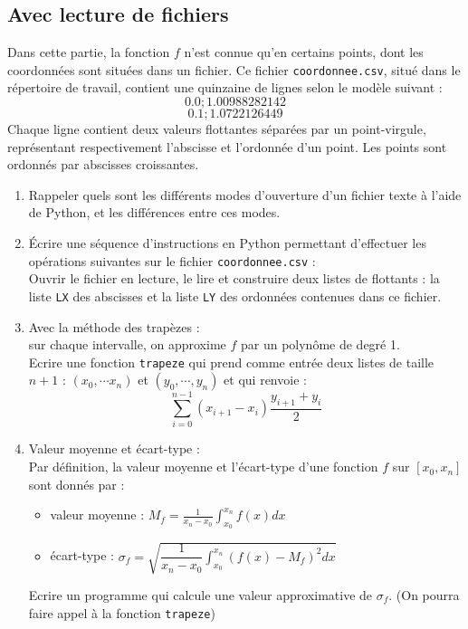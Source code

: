 \subsection{Avec lecture de fichiers}
Dans cette partie, la fonction $f$ n'est connue qu'en certains points, dont les coordonn\' ees sont situ\' ees dans un fichier. Ce fichier \texttt{coordonnee.csv}, situé dans le répertoire de travail, contient une quinzaine de lignes selon le modèle suivant :
\[0.0;1.00988282142\]
\[0.1;1.0722126449\]
Chaque ligne contient deux valeurs flottantes séparées par un point-virgule, représentant respectivement l'abscisse et l'ordonnée d'un point. Les points sont ordonnés par abscisses croissantes.
\begin{enumerate}
\item Rappeler quels sont les différents modes d'ouverture d'un fichier texte à l'aide de Python, et les différences entre ces modes.
\item \'Ecrire une séquence d'instructions en Python permettant d'effectuer les opérations suivantes sur le fichier \texttt{coordonnee.csv} :\\
Ouvrir le fichier en lecture, le lire et construire deux listes de flottants : la liste \verb?LX? des abscisses et la liste \verb?LY? des ordonnées contenues dans ce fichier.
\item Avec la méthode des trapèzes : \\
sur chaque intervalle, on approxime $f$ par un polynôme de degré 1.\\
Ecrire une fonction \verb?trapeze? qui prend comme entrée deux listes de taille $n+1$ : $(x_0,\cdots x_n)$ et $(y_0,\cdots,y_{n})$ et qui renvoie :
\[\displaystyle \sum_{i=0}^{n-1} (x_{i+1}-x_i)\dfrac{y_{i+1}+y_i}{2}\]
\item Valeur moyenne et écart-type :\\
Par définition, la valeur moyenne et l'écart-type d'une fonction $f$ sur $[x_0,x_n]$ sont donnés par :
\begin{itemize}
\item valeur moyenne : $M_f=\displaystyle{ \frac{1}{x_n-x_0} \int_{x_0}^{x_n} f(x)dx}$\medskip 
\item écart-type : $\displaystyle{\sigma_f=\sqrt{\dfrac{1}{x_n-x_0}\int_{x_0}^{x_n}(f(x)-M_f)^2dx}}$
\end{itemize}
Ecrire un programme qui calcule une valeur approximative de $\sigma_f$. (On pourra faire appel à la fonction \verb?trapeze?)
\end{enumerate}



